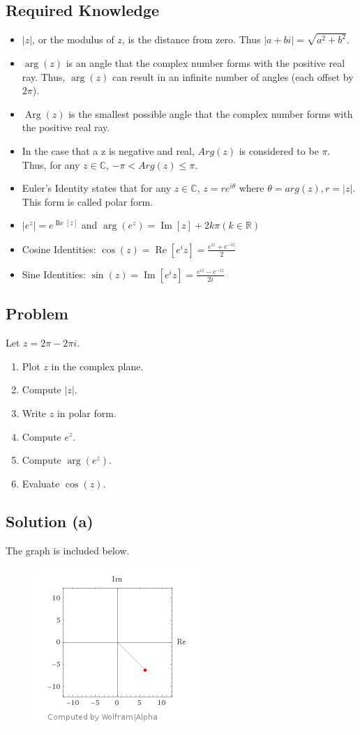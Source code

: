 \documentclass[12pt]{article}
\newcommand{\real}{\mathbb{R}}
\newcommand{\complex}{\mathbb{C}}
\newcommand{\Arg}{\operatorname{Arg}}
\renewcommand{\Re}{\operatorname{Re}}
\renewcommand{\Im}{\operatorname{Im}}
\begin{document}
\subsection{Required Knowledge}
\begin{itemize}
    \item $|z|$, or the modulus of $z$, is the distance from zero.  Thus $|a+bi|=\sqrt{a^2+b^2}$.
    \item $\arg(z)$ is an angle that the complex number forms with the positive real ray.  Thus, $\arg(z)$ can result in an infinite number of angles (each offset by $2\pi$).
    \item $\Arg(z)$ is the smallest possible angle that the complex number forms with the positive real ray.
    \item In the case that a z is negative and real, $Arg(z)$ is considered to be $\pi$.  Thus, for any $z\in\complex$, $-\pi<Arg(z)\leq\pi$.
    \item Euler's Identity states that for any $z\in\complex$, $z=re^{i\theta}$ where $\theta=arg(z), r=|z|$.  This form is called polar form.
    \item $|e^z|=e^{\Re[z]}$ and $\arg(e^z)=\Im[z]+2k\pi (k\in\real)$
    \item Cosine Identities: $\cos(z)=\Re[e^iz]=\frac{e^{iz}+e^{-iz}}{2}$
    \item Sine Identities: $\sin(z)=\Im[e^iz]=\frac{e^{iz}-e^{-iz}}{2i}$
\end{itemize}
\subsection{Problem}
Let $z=2\pi-2\pi i$.
\begin{enumerate}[label=\alph*. ]
    \item Plot $z$ in the complex plane.
    \item Compute $|z|$.
    \item Write $z$ in polar form.
    \item Compute $e^z$.
    \item Compute $\arg(e^z)$.
    \item Evaluate $\cos(z)$.
\end{enumerate}
\subsection{Solution (a)}
The graph is included below.
\begin{figure}[H]
    \includegraphics{Topic2Graph.png}
\end{figure}
\end{document}

